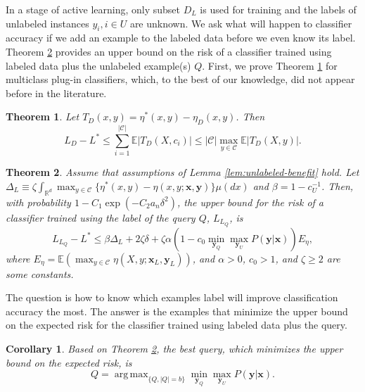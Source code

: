 \documentclass[10pt,twocolumn]{IEEEtran}
\newtheorem{theorem}{Theorem}
\newtheorem{corollary}{Corollary}
\DeclareMathOperator*{\argmax}{arg\,max}
\begin{document}
	In a stage of active learning, only subset $D_L$ is used for training and the labels of unlabeled instances $y_i, i \in U$ are unknown. We ask what will happen to classifier accuracy if we add an example to the labeled data before we even know its label. Theorem \ref{thm:risk-upper-bound} provides an upper bound on the risk of a classifier trained using labeled data plus the unlabeled example(s) $Q$. First, we prove Theorem \ref{thm:plug-in-risk-bound} for multiclass plug-in classifiers, which, to the best of our knowledge, did not appear before in the literature.
	
	\begin{theorem} \label{thm:plug-in-risk-bound}
		Let $T_D(x, y) = \eta^*(x, y) - \eta_D(x, y)$. Then
		\begin{equation}
			L_D - L^* \le \sum_{i=1}^{|\mathcal{C}|} \mathbb{E}|T_D(X, c_i)| \le |\mathcal{C}| \max_{y \in \mathcal{C}} \mathbb{E}|T_D(X, y)|.
		\end{equation}
	\end{theorem}
	
	\begin{theorem} \label{thm:risk-upper-bound}
		Assume that assumptions of Lemma \ref{lem:unlabeled-benefit} hold. Let $\Delta_L \equiv \zeta \int_{\mathbb{R}^d} \max_{y \in \mathcal{C}}\{\eta^*(x, y)-\eta(x, y; \mathbf{x}, \mathbf{y})\}\mu(dx)$ and $\beta = 1-c_U^{-1}$. Then, with probability $1 - C_1 \exp(-C_2 a_n \delta^2)$, the upper bound for the risk of a classifier trained using the label of the query $Q$, $L_{L_Q}$, is
		\begin{equation}
			L_{L_Q} - L^* \le \beta \Delta_L + 2\zeta \delta + \zeta \alpha \left( 1 - c_0 \min_{\mathbf{y}_Q} \max_{\mathbf{y}_U} P(\mathbf{y}|\mathbf{x}) \right) E_\eta,
		\end{equation}
		where $E_\eta = \mathbb{E}(\max_{y \in \mathcal{C}} \eta(X, y; \mathbf{x}_L, \mathbf{y}_L))$, and $\alpha > 0$, $c_0 > 1$, and $\zeta \ge 2$ are some constants.
	\end{theorem}
	
	The question is how to know which examples label will improve classification accuracy the most. The answer is the examples that minimize the upper bound on the expected risk for the classifier trained using labeled data plus the query.
	
	\begin{corollary} \label{cor:pmal-query}
		Based on Theorem \ref{thm:risk-upper-bound}, the best query, which minimizes the upper bound on the expected risk, is
		\begin{equation}
			Q = \argmax_{\{Q, |Q|=b\}} \min_{\mathbf{y}_Q} \max_{\mathbf{y}_U} P(\mathbf{y}|\mathbf{x}).
		\end{equation}
	\end{corollary}
	
\end{document}
